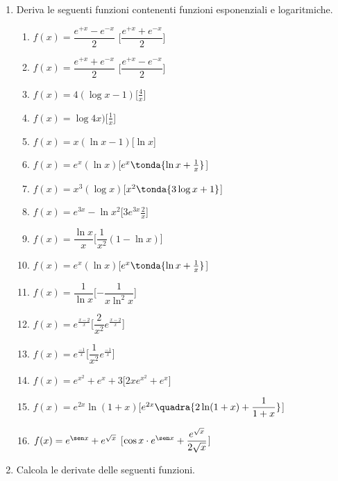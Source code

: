 \begin{enumerate}
\item Deriva le seguenti funzioni contenenti funzioni esponenziali e 
logaritmiche.

\begin{enumerate}
\item \(f(x) = \dfrac{e^{+x} - e^{-x}}{2}\) \hfill 
  [\(\dfrac{e^{+x} + e^{-x}}{2}\)]
\item \(f(x) = \dfrac{e^{+x} + e^{-x}}{2}\) \hfill 
  [\(\dfrac{e^{+x} - e^{-x}}{2}\)]
\item \(f(x)=4(\log x -1)\)\hfill [\(\frac{4}{x}\)]
\item \(f(x)=\log 4x)\)\hfill [\(\frac{1}{x}\)]
\item \(f(x)=x(\ln x -1)\)\hfill [\(\ln x\)]
\item \(f(x)=e^x(\ln x)\)\hfill [\(e^x\tonda{\ln x+\frac{1}{x}}\)]
\item \(f(x)=x^3(\log x)\)\hfill [\(x^2\tonda{3\log x+1}\)]
\item \(f(x)=e^{3x}-\ln x^2\)\hfill [\(3e^{3x}\frac{2}{x}\)]
\item \(f(x)=\dfrac{\ln x}{x}\)\hfill [\(\dfrac{1}{x^2}(1-\ln x)\)]
\item \(f(x)=e^x(\ln x)\)\hfill [\(e^x\tonda{\ln x+\frac{1}{x}}\)]
\item \(f(x)=\dfrac{1}{\ln x}\)\hfill [\(-\dfrac{1}{x\ln^2 x}\)]
\item \(f(x)=e^{\frac{x-2}{x}}\)\hfill [\(\dfrac{2}{x^2}e^{\frac{x-2}{x}}\)]
\item \(f(x)=e^{\frac{-1}{x}}\)\hfill [\(\dfrac{1}{x^2}e^{\frac{-1}{x}}\)]
\item \(f(x)=e^{x^2}+e^x+3\)\hfill [\(2xe^{x^2}+e^x\)]
\item \(f(x)=e^{2x}\ln(1+x)\)\hfill[\(e^{2x}\quadra{2\ln (1+x)+\dfrac{1}{1+x}}\)]
\item \(f(x)=e^{\sen x}+e^{\sqrt{x}}\)\hfill 
[\(\cos x \cdot e^{\sen x}+ \dfrac{e^{\sqrt{x}}}{2\sqrt{x}}\)]
\end{enumerate}

\pagebreak %

\item Calcola le derivate delle seguenti funzioni.


\end{enumerate}
